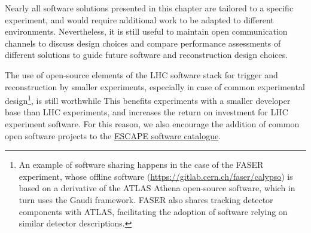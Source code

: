 Nearly all software solutions presented in this chapter are tailored to
a specific experiment, and would require additional work to be adapted
to different environments. Nevertheless, it is still useful to maintain
open communication channels to discuss design choices and compare
performance assessments of different solutions to guide future software
and reconstruction design choices.

The use of open-source elements of the LHC software stack for trigger
and reconstruction by smaller experiments, especially in case of common
experimental design\footnote{An example of software sharing happens in
  the case of the FASER experiment, whose offline software
  (\href{https://gitlab.cern.ch/faser/calypso}{{https://gitlab.cern.ch/faser/calypso}})
  is based on a derivative of the ATLAS Athena open-source software, which in turn uses the Gaudi framework. FASER
  also shares tracking detector components with ATLAS, facilitating the
  adoption of software relying on similar detector descriptions.}, is
still worthwhile This benefits experiments with a smaller developer base
than LHC experiments, and increases the return on investment for LHC
experiment software. For this reason, we also encourage the addition of
common open software projects to the \href{https://projectescape.eu/services/open-source-scientific-software-and-service-repository}{ESCAPE software catalogue}.
